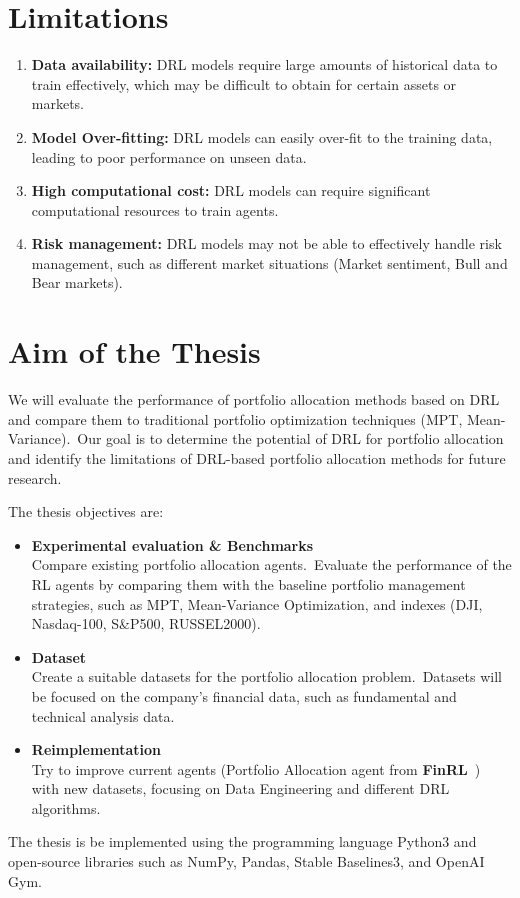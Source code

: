 \documentclass[../xlapes02]{subfiles}
\begin{document}
    \section{Limitations}\label{sec:limitations}

    \begin{enumerate}
        \item \textbf{Data availability:} DRL models require large amounts of historical data to train effectively, which may be difficult to obtain for certain assets or markets.
        \item \textbf{Model Over-fitting:} DRL models can easily over-fit to the training data, leading to poor performance on unseen data.
        \item \textbf{High computational cost:} DRL models can require significant computational resources to train agents.
        \item \textbf{Risk management:} DRL models may not be able to effectively handle risk management, such as different market situations (Market sentiment, Bull and Bear markets).
    \end{enumerate}


    \section{Aim of the Thesis}\label{sec:aim-of-the-thesis}
    We will evaluate the performance of portfolio allocation methods based on DRL and compare them to traditional portfolio optimization techniques (MPT, Mean-Variance).\ Our goal is to determine the potential of DRL for portfolio allocation and identify the limitations of DRL-based portfolio allocation methods for future research.

    The thesis objectives are:
    \begin{itemize}
        \item \textbf{Experimental evaluation \& Benchmarks}\\ Compare existing portfolio allocation agents.\ Evaluate the performance of the RL agents by comparing them with the baseline portfolio management strategies, such as MPT, Mean-Variance Optimization, and indexes (DJI, Nasdaq-100, S\&P500, RUSSEL2000).
        \item \textbf{Dataset}\\ Create a suitable datasets for the portfolio allocation problem.\ Datasets will be focused on the company's financial data, such as fundamental and technical analysis data.
        \item \textbf{Reimplementation}\\ Try to improve current agents (Portfolio Allocation agent from \textbf{FinRL}~\cite{finrl-portfolio-allocation-2020}) with new datasets, focusing on Data Engineering and different DRL algorithms.
    \end{itemize}

    The thesis is be implemented using the programming language Python3 and open-source libraries such as NumPy, Pandas, Stable Baselines3, and OpenAI Gym.
\end{document}
